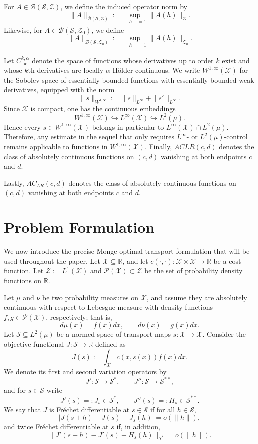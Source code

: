 \documentclass[12pt,leqno]{amsart}
\begin{document}
For $A\in\mathcal{B}(\mathcal{S},\mathcal{Z})$, we define the induced operator norm by
\[
\|A\|_{\mathcal{B}(\mathcal{S},\mathcal{Z})} := \sup_{\|h\|=1}\|A(h)\|_{\mathcal{Z}}.
\]
Likewise, for $A\in\mathcal{B}(\mathcal{S},\mathcal{Z}_0)$, we define
\[
\|A\|_{\mathcal{B}(\mathcal{S},\mathcal{Z}_0)} := \sup_{\|h\|=1}\|A(h)\|_{\mathcal{Z}_0}.
\]

Let \(C^{k,\alpha}_{\mathrm{loc}}\) denote the space of functions whose derivatives up to order \(k\) exist and whose \(k\)th derivatives are locally \(\alpha\)-H\"older continuous. We write \(W^{1,\infty}(\mathcal X)\) for the Sobolev space of essentially bounded functions with essentially bounded weak derivatives, equipped with the norm
\[
\|s\|_{W^{1,\infty}}
:=
\|s\|_{L^\infty}+\|s'\|_{L^\infty}.
\]
Since \(\mathcal X\) is compact, one has the continuous embeddings
\[
W^{1,\infty}(\mathcal X)\hookrightarrow L^\infty(\mathcal X)\hookrightarrow L^2(\mu).
\]
Hence every \(s\in W^{1,\infty}(\mathcal X)\) belongs in particular to \(L^\infty(\mathcal X)\cap L^2(\mu)\). Therefore, any estimate in the sequel that only requires \(L^\infty\)- or \(L^2(\mu)\)-control remains applicable to functions in \(W^{1,\infty}(\mathcal X)\). Finally, \(ACLR(c,d)\) denotes the class of absolutely continuous functions on \((c,d)\) vanishing at both endpoints \(c\) and \(d\).

Lastly, $AC_{LR}(c,d)$ denotes the class of absolutely continuous functions on $(c,d)$ vanishing at both endpoints $c$ and $d$.


\section{Problem Formulation}\label{sec:formulation}
We now introduce the precise Monge optimal transport formulation that will be used throughout the paper.
Let $\mathcal{X}\subseteq \mathbb R$, and let $c(\cdot,\cdot):\mathcal{X}\times\mathcal{X}\rightarrow\mathbb R$ be a cost function. Let $\mathcal{Z} := L^1(\mathcal{X})$ and $\mathcal{P}(\mathcal{X})\subset \mathcal{Z} $ be the set of probability density functions on $\mathbb R$.

Let $\mu$ and $\nu$ be two probability measures on $\mathcal{X}$, and assume they are absolutely continuous
with respect to Lebesgue measure with density functions $f,g\in \mathcal{P}(\mathcal{X})$, respectively; that is,
\[
d\mu(x)=f(x)dx, \qquad d\nu(x)=g(x)dx.
\]
Let $\mathcal{S}\subseteq L^2(\mu)$ be a normed space of transport maps $s:\mathcal{X}\to\mathcal{X}$. Consider the objective functional $J:\mathcal{S}\rightarrow \mathbb R$ defined as 
\[
J(s) :=\int_{\mathcal{X}} c(x, s(x))f(x)dx.
\]
We denote its first and second variation operators by
\[
J':\mathcal{S}\to \mathcal{S}^*, \qquad J'':\mathcal{S}\to \mathcal{S}^{**},
\]
and for $s\in\mathcal{S}$ write
\[
J'(s)=:J_s\in\mathcal{S}^*, \qquad J''(s)=:H_s\in\mathcal{S}^{**}.
\]
We say that $J$ is Fr\'echet differentiable at $s \in\mathcal{S}$ if for all $h\in\mathcal{S}$, 
\[
\big|J(s+h)-J(s)-J_s(h)\big|=o(\|h\|),
\]
and twice Fr\'echet differentiable at $s$ if, in addition,
\[
\|J'(s+h)-J'(s)-H_s(h)\|_{\mathcal{S}^*}=o(\|h\|).
\]
\end{document}
